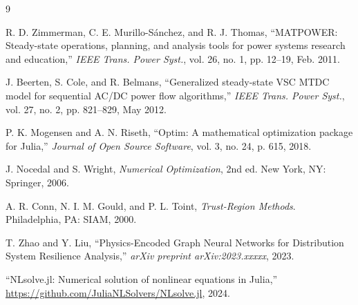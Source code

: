 \documentclass[11pt]{article}
\begin{document}

\begin{thebibliography}{9}

R. D. Zimmerman, C. E. Murillo-Sánchez, and R. J. Thomas,
``MATPOWER: Steady-state operations, planning, and analysis tools for power systems research and education,''
\textit{IEEE Trans. Power Syst.}, vol. 26, no. 1, pp. 12--19, Feb. 2011.

J. Beerten, S. Cole, and R. Belmans,
``Generalized steady-state VSC MTDC model for sequential AC/DC power flow algorithms,''
\textit{IEEE Trans. Power Syst.}, vol. 27, no. 2, pp. 821--829, May 2012.

P. K. Mogensen and A. N. Riseth,
``Optim: A mathematical optimization package for Julia,''
\textit{Journal of Open Source Software}, vol. 3, no. 24, p. 615, 2018.

J. Nocedal and S. Wright,
\textit{Numerical Optimization}, 2nd ed.
New York, NY: Springer, 2006.

A. R. Conn, N. I. M. Gould, and P. L. Toint,
\textit{Trust-Region Methods}.
Philadelphia, PA: SIAM, 2000.

T. Zhao and Y. Liu,
``Physics-Encoded Graph Neural Networks for Distribution System Resilience Analysis,''
\textit{arXiv preprint arXiv:2023.xxxxx}, 2023.

``NLsolve.jl: Numerical solution of nonlinear equations in Julia,''
\url{https://github.com/JuliaNLSolvers/NLsolve.jl}, 2024.

\end{thebibliography}
\end{document}
